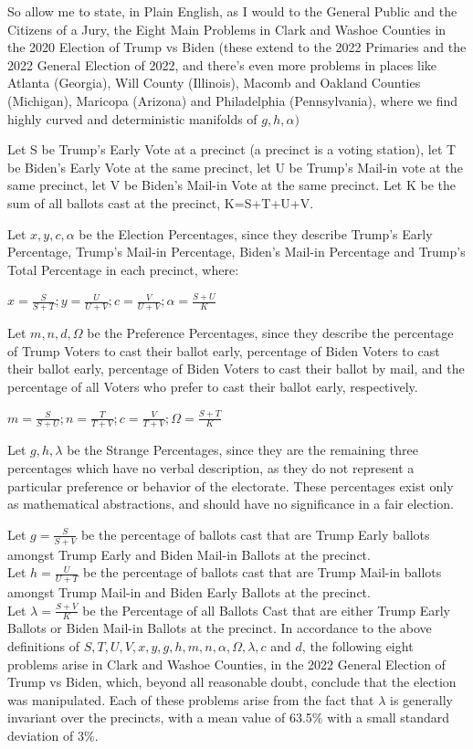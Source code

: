So allow me to state, in Plain English, as I would to the General Public and the Citizens of a Jury, the Eight Main Problems in Clark and Washoe Counties in the 2020 Election of Trump vs Biden (these extend to the 2022 Primaries and the 2022 General Election of 2022, and there's even more problems in places like Atlanta (Georgia), Will County (Illinois), Macomb and Oakland Counties (Michigan), Maricopa (Arizona) and Philadelphia (Pennsylvania), where we find highly curved and deterministic manifolds of $g,h,\alpha)$

Let S be Trump's Early Vote at a precinct (a precinct is a voting station), let T be Biden's Early Vote at the same precinct, let U be Trump's Mail-in vote at the same precinct, let V be Biden's Mail-in Vote at the same precinct. Let K be the sum of all ballots cast at the precinct, K=S+T+U+V.

Let $x,y,c,\alpha$ be the Election Percentages, since they describe Trump's Early Percentage, Trump's Mail-in Percentage, Biden's Mail-in Percentage and Trump's Total Percentage in each precinct, where:

$x=\frac{S}{S+T}; y=\frac{U}{U+V}; c=\frac{V}{U+V}; \alpha=\frac{S+U}{K}$

Let $m,n,d,\Omega$ be the Preference Percentages, since they describe the percentage of Trump Voters to cast their ballot early, percentage of Biden Voters to cast their ballot early, percentage of Biden Voters to cast their ballot by mail, and the percentage of all Voters who prefer to cast their ballot early, respectively.

$m=\frac{S}{S+U}; n=\frac{T}{T+V}; c=\frac{V}{T+V}; \Omega=\frac{S+T}{K}$

Let $g,h,\lambda$ be the Strange Percentages, since they are the remaining three percentages which have no verbal description, as they do not represent a particular preference or behavior of the electorate. These percentages exist only as mathematical abstractions, and should have no significance in a fair election.

Let $g=\frac{S}{S+V}$ be the percentage of ballots cast that are Trump Early ballots amongst Trump Early and Biden Mail-in Ballots at the precinct.\\
Let $h=\frac{U}{U+T}$  be the percentage of ballots cast that are Trump Mail-in ballots amongst Trump Mail-in and Biden Early Ballots at the precinct.\\
Let $\lambda=\frac{S+V}{K}$ be the Percentage of all Ballots Cast that are either Trump Early Ballots or Biden Mail-in Ballots at the precinct.
\newpage
In accordance to the above definitions of $S,T,U,V,x,y,g,h,m,n,\alpha,\Omega,\lambda,c$ and $d$, the following eight problems arise in Clark and Washoe Counties, in the 2022 General Election of Trump vs Biden, which, beyond all reasonable doubt, conclude that the election was manipulated. Each of these problems arise from the fact that $\lambda$ is generally invariant over the precincts, with a mean value of 63.5\% with a small standard deviation of 3\%.

